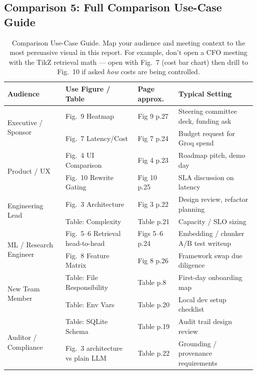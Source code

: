 \documentclass[12pt,a4paper]{article}
\begin{document}
\subsection{Comparison 5: Full Comparison Use-Case Guide}

\begin{table}[H]
\centering
\footnotesize
\begin{tabular}{@{}lp{3.5cm}p{3cm}p{4.5cm}@{}}
\toprule
\textbf{Audience} & \textbf{Use Figure / Table} & \textbf{Page approx.} & \textbf{Typical Setting} \\
\midrule
\multirow{2}{*}{Executive / Sponsor} & Fig.\ 9 Heatmap & Fig 9 p.27 & Steering committee deck, funding ask \\
{} & Fig.\ 7 Latency/Cost & Fig 7 p.24 & Budget request for Groq spend \\
\midrule
\multirow{2}{*}{Product / UX} & Fig.\ 4 UI Comparison & Fig 4 p.23 & Roadmap pitch, demo day \\
{} & Fig.\ 10 Rewrite Gating & Fig 10 p.25 & SLA discussion on latency \\
\midrule
\multirow{2}{*}{Engineering Lead} & Fig.\ 3 Architecture & Fig 3 p.22 & Design review, refactor planning \\
{} & Table: Complexity & Table p.21 & Capacity / SLO sizing \\
\midrule
\multirow{2}{*}{ML / Research Engineer} & Fig.\ 5--6 Retrieval head-to-head & Figs 5--6 p.24 & Embedding / chunker A/B test writeup \\
{} & Fig.\ 8 Feature Matrix & Fig 8 p.26 & Framework swap due diligence \\
\midrule
\multirow{2}{*}{New Team Member} & Table: File Responsibility & Table p.8 & First-day onboarding map \\
{} & Table: Env Vars & Table p.20 & Local dev setup checklist \\
\midrule
\multirow{2}{*}{Auditor / Compliance} & Table: SQLite Schema & Table p.19 & Audit trail design review \\
{} & Fig.\ 3 architecture vs plain LLM & Table p.22 & Grounding / provenance requirements \\
\bottomrule
\end{tabular}
\caption{Comparison Use-Case Guide. Map your audience and meeting context to the most persuasive visual in this report. For example, don't open a CFO meeting with the TikZ retrieval math — open with Fig.\ 7 (cost bar chart) then drill to Fig.\ 10 if asked \textit{how} costs are being controlled.}
\label{tab:useguide}
\end{table}
\end{document}
